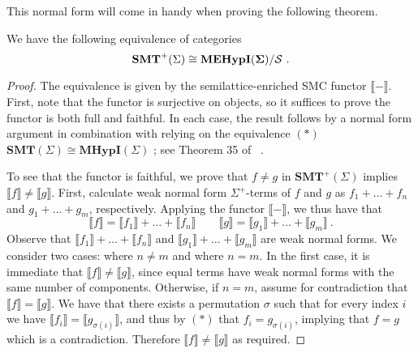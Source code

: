 
This normal form will come in handy when proving the following theorem.

\begin{theorem}
\label{thm:completeness_simple}
We have the following equivalence of categories
\[
	\textbf{SMT}^{+}(\Sigma) \cong {\mathbf{MEHypI(\Sigma)}} / \mathcal{S}~.
\]	
\end{theorem}
\begin{proof}
The equivalence is given by the semilattice-enriched SMC functor $\llbracket - \rrbracket$.  
First, note that the functor is surjective on objects,  so it suffices to prove the functor is both full and faithful.  
In each case,  the result follows by a normal form argument in combination with relying on the equivalence $(*)$ $\textbf{SMT}(\Sigma) \cong \textbf{MHypI}(\Sigma)$ 
; see Theorem 35 of ~\cite{bonchi_string_2022-2}.

To see that the functor is faithful,  we prove that $f \neq g$ in $\textbf{SMT}^+(\Sigma)$ implies $\llbracket f \rrbracket \neq \llbracket g \rrbracket$.  
First,  calculate weak normal form $\Sigma^+$-terms of $f$ and $g$ as $f_1 + \ldots + f_n$ and $g_1 + \ldots + g_m$,  respectively.  Applying the functor $\llbracket - \rrbracket$,  we thus have that
\[
	\llbracket f \rrbracket = \llbracket f_1 \rrbracket + \ldots + \llbracket f_n \rrbracket \qquad
	\llbracket g \rrbracket = \llbracket g_1 \rrbracket + \ldots + \llbracket g_m \rrbracket ~ . 
\]
Observe that $\llbracket f_1 \rrbracket + \ldots + \llbracket f_n \rrbracket$ and $\llbracket g_1 \rrbracket + \ldots + \llbracket g_m \rrbracket$ are weak normal forms.  
We consider two cases: where $n \neq m$ and where $n = m$.  
In the first case,  it is immediate that $\llbracket f \rrbracket \neq \llbracket g \rrbracket $,  since equal terms have weak normal forms with the same number of components.  
Otherwise,  if $n = m$,  assume for contradiction that $\llbracket f \rrbracket = \llbracket g \rrbracket$.  
We have that there exists a permutation $\sigma$ such that for every index $i$ we have $\llbracket f_i \rrbracket = \llbracket g_{\sigma(i)} \rrbracket $,  and thus by  $(*)$ that $f_i = g_{\sigma(i)}$,  implying that $f = g$ which is a contradiction.  
Therefore $\llbracket f \rrbracket \neq \llbracket g \rrbracket$ as required. 


\end{proof}
